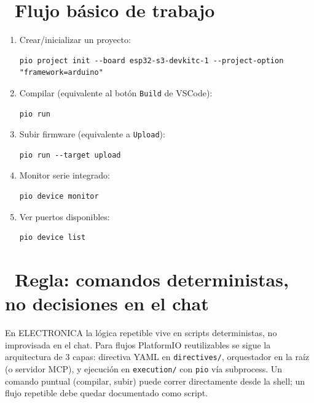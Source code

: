 \documentclass[11pt,a4paper]{article}
\newcommand{\iconotexto}[2]{\textcolor{cyanNeon}{\faIcon{#1}}~#2}
\begin{document}
\section{\iconotexto{project-diagram}{Flujo b\'asico de trabajo}}

\begin{enumerate}[leftmargin=1.8em, itemsep=4pt]
  \item Crear/inicializar un proyecto:
\begin{lstlisting}
pio project init --board esp32-s3-devkitc-1 --project-option "framework=arduino"
\end{lstlisting}
  \item Compilar (equivalente al bot\'on \texttt{Build} de VSCode):
\begin{lstlisting}
pio run
\end{lstlisting}
  \item Subir firmware (equivalente a \texttt{Upload}):
\begin{lstlisting}
pio run --target upload
\end{lstlisting}
  \item Monitor serie integrado:
\begin{lstlisting}
pio device monitor
\end{lstlisting}
  \item Ver puertos disponibles:
\begin{lstlisting}
pio device list
\end{lstlisting}
\end{enumerate}

\section{\iconotexto{cogs}{Regla: comandos deterministas, no decisiones en el chat}}

En ELECTRONICA la l\'ogica repetible vive en scripts deterministas, no improvisada en el chat.
Para flujos PlatformIO reutilizables se sigue la arquitectura de 3 capas: directiva YAML en
\texttt{directives/}, orquestador en la ra\'iz (o servidor MCP), y ejecuci\'on en
\texttt{execution/} con \texttt{pio} vía subprocess. Un comando puntual (compilar, subir)
puede correr directamente desde la shell; un flujo repetible debe quedar documentado como script.

\end{document}
